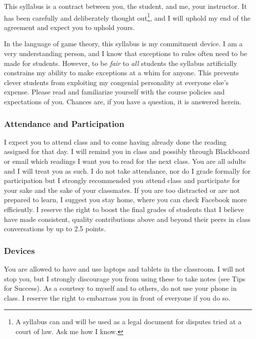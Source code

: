 \documentclass{article}
\begin{document}
This syllabus is a contract between you, the student, and me, your
instructor. It has been carefully and deliberately thought out\footnote{A
  syllabus can and will be used as a legal document for disputes tried
  at a court of law. Ask me how I know.}, and I will uphold my end of
the agreement and expect you to uphold yours.

In the language of game theory, this syllabus is my commitment device. I
am a very understanding person, and I know that exceptions to rules
often need to be made for students. However, to be \emph{fair} to
\emph{all} students the syllabus artificially constrains my ability to
make exceptions at a whim for anyone. This prevents clever students from
exploiting my congenial personality at everyone else's expense. Please
read and familiarize yourself with the course policies and expectations
of you. Chances are, if you have a question, it is answered herein.

\hypertarget{attendance-and-participation}{%
\subsubsection{Attendance and
Participation}\label{attendance-and-participation}}

I expect you to attend class and to come having already done the reading
assigned for that day. I will remind you in class and possibly through
Blackboard or email which readings I want you to read for the next
class. You are all adults and I will treat you as such. I do not take
attendance, nor do I grade formally for participation but I strongly
recommended you attend class and participate for your sake and the sake
of your classmates. If you are too distracted or are not prepared to
learn, I suggest you stay home, where you can check Facebook more
efficiently. I reserve the right to boost the final grades of students
that I believe have made consistent, quality contributions above and
beyond their peers in class conversations by up to 2.5 points.

\hypertarget{devices}{%
\subsubsection{Devices}\label{devices}}

You are allowed to have and use laptops and tablets in the classroom. I
will not stop you, but I strongly discourage you from using these to
take notes (see Tips for Success). As a courtesy to myself and to
others, do not use your phone in class. I reserve the right to embarrass
you in front of everyone if you do so.
\end{document}
